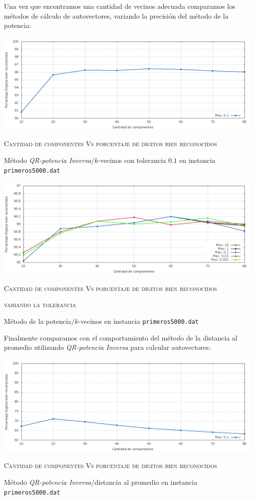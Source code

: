 		Una vez que encontramos una cantidad de vecinos adecuada comparamos los m\'etodos
		de c\'alculo de autovectores, variando la precisi\'on del m\'etodo de la potencia:

		\vspace{5mm}
		\centerline{\includegraphics[width=20cm]{img/QRkVecinos.png}}
		\centerline{\textsc{Cantidad de componentes Vs porcentaje de d\'igitos bien
		reconocidos}}
		\centerline{M\'etodo \textit{QR-potencia Inversa}/$k$-vecinos con tolerancia $0.1$
		en instancia \texttt{primeros5000.dat}}
		\vspace{5mm}
		
		\vspace{5mm}
		\centerline{\includegraphics[width=20cm]{img/PSprec.png}}
		\centerline{\textsc{Cantidad de componentes Vs porcentaje de d\'igitos bien
		reconocidos}}
		\centerline{\textsc{variando la tolerancia}}
		\centerline{M\'etodo de la potencia/$k$-vecinos en instancia \texttt{primeros5000.dat}}
		\vspace{5mm}

		Finalmente comparamos con el comportamiento del m\'etodo de la distancia al promedio
		utilizando \textit{QR-potencia Inversa} para calcular autovectores:
	
		\vspace{5mm}
		\centerline{\includegraphics[width=20cm]{img/QRDistanciasMedias.png}}
		\centerline{\textsc{Cantidad de componentes Vs porcentaje de d\'igitos bien
		reconocidos}}
		\centerline{M\'etodo \textit{QR-potencia Inversa}/distancia al promedio en instancia \texttt{primeros5000.dat}}
		\vspace{5mm}


